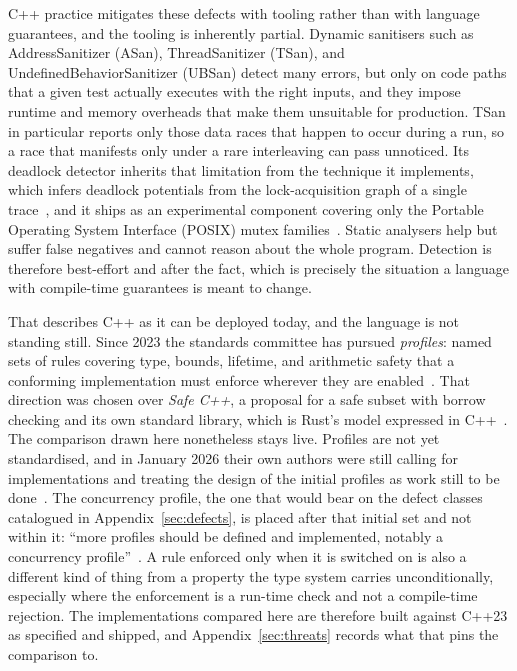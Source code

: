 \documentclass[english,oneside,a4paper,censored,csm,software-track-2020]{HYthesisML}
\begin{document}
\begin{appendices}
C++ practice mitigates these defects with tooling rather than with language guarantees, and
the tooling is inherently partial. Dynamic sanitisers such as AddressSanitizer (ASan),
ThreadSanitizer (TSan), and UndefinedBehaviorSanitizer (UBSan) detect many errors, but only on
code paths that a given test actually executes with the right inputs, and they impose runtime
and memory overheads that make them unsuitable for production. TSan in particular reports only
those data races that happen to occur during a run, so a race that manifests only under a rare
interleaving can pass unnoticed. Its deadlock detector inherits that limitation from the technique
it implements, which infers deadlock potentials from the lock-acquisition graph of a single
trace~\cite{bensalem2005deadlock}, and it ships as an experimental component covering only the
Portable Operating System Interface (POSIX) mutex families~\cite{tsandeadlock}. Static
analysers help but suffer false negatives and cannot
reason about the whole program. Detection is therefore best-effort and after the fact, which
is precisely the situation a language with compile-time guarantees is meant to change.

That describes C++ as it can be deployed today, and the language is not standing still. Since
2023 the standards committee has pursued \emph{profiles}: named sets of rules covering type,
bounds, lifetime, and arithmetic safety that a conforming implementation must enforce wherever
they are enabled~\cite{sutter2025profiles}. That direction was chosen over \emph{Safe C++}, a
proposal for a safe subset with borrow checking and its own standard library, which is Rust's
model expressed in C++~\cite{baxter2024safecpp}. The comparison drawn here nonetheless stays
live. Profiles are not yet standardised, and in January 2026 their own authors were still
calling for implementations and treating the design of the initial profiles as work still to be
done~\cite{vandevoorde2026profiles}. The concurrency profile, the one that would bear on the
defect classes catalogued in Appendix~\ref{sec:defects}, is placed after that initial set and
not within it: ``more profiles should be defined and implemented, notably a concurrency
profile''~\cite{vandevoorde2026profiles}. A rule enforced only when it is switched on is also a
different kind of thing from a property the type system carries unconditionally, especially
where the enforcement is a run-time check and not a compile-time rejection. The implementations
compared here are therefore built against C++23 as specified and shipped, and
Appendix~\ref{sec:threats} records what that pins the comparison to.


\end{appendices}
\end{document}

